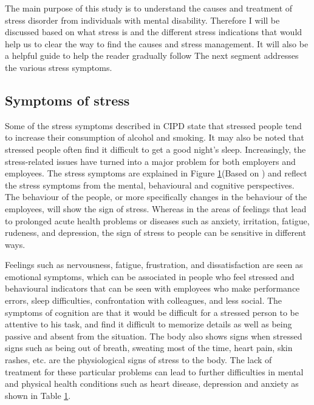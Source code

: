 The main purpose of this study is to understand the causes and treatment of stress disorder from individuals with mental disability. Therefore I will be discussed based on what stress is and the different stress indications that would help us to clear the way to find the causes and stress management.  It will also be a helpful guide to help the reader gradually follow The next segment addresses the various stress symptoms.

\subsection{Symptoms of stress}
Some of the stress symptoms described in \acs{CIPD} state that stressed people tend to increase their consumption of alcohol and smoking. It may also be noted that stressed people often find it difficult to get a good night's sleep.  Increasingly, the stress-related issues have turned into a major problem for both employers and employees. The stress symptoms are explained in Figure \ref{fig:symptom}(Based on \cite{MayoClinic2018Post-traumaticCauses}) and reflect the stress symptoms from the mental, behavioural and cognitive perspectives. The behaviour of the people, or more specifically changes in the behaviour of the employees, will show the sign of stress. Whereas in the areas of feelings that lead to prolonged acute health problems or diseases such as anxiety, irritation, fatigue, rudeness, and depression, the sign of stress to people can be sensitive in different ways.

\begin{figure}[ht!]
\centering
{}
  \label{fig:symptom}
\end{figure}

Feelings such as nervousness, fatigue, frustration, and dissatisfaction are seen as emotional symptoms, which can be associated in people who feel stressed and behavioural indicators that can be seen with employees who make performance errors, sleep difficulties, confrontation with colleagues, and less social. 
The symptoms of cognition are that it would be difficult for a stressed person to be attentive to his task, and find it difficult to memorize details as well as being passive and absent from the situation.
The body also shows signs when stressed signs such as being out of breath, sweating most of the time, heart pain, skin rashes, etc. are the physiological signs of stress to the body. The lack of treatment for these particular problems can lead to further difficulties in mental and physical health conditions such as heart disease, depression and anxiety as shown in Table \ref{fig:symptom}.

